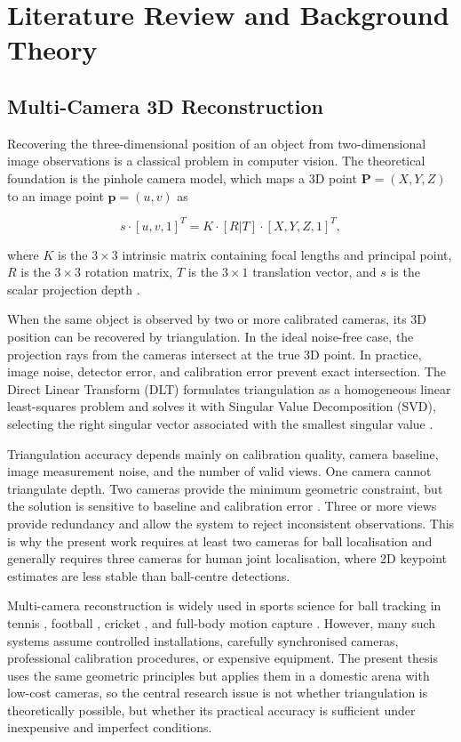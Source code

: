\chapter{Literature Review and Background Theory}

\section{Multi-Camera 3D Reconstruction}

Recovering the three-dimensional position of an object from two-dimensional image observations is a classical problem in computer vision. The theoretical foundation is the pinhole camera model, which maps a 3D point $\mathbf{P} = (X, Y, Z)$ to an image point $\mathbf{p} = (u, v)$ as

\begin{equation}
s \cdot [u, v, 1]^T = K \cdot [R | T] \cdot [X, Y, Z, 1]^T ,
\label{eq:2_1}
\end{equation}

where $K$ is the $3 \times 3$ intrinsic matrix containing focal lengths and principal point, $R$ is the $3 \times 3$ rotation matrix, $T$ is the $3 \times 1$ translation vector, and $s$ is the scalar projection depth \cite{ref1}.

When the same object is observed by two or more calibrated cameras, its 3D position can be recovered by triangulation. In the ideal noise-free case, the projection rays from the cameras intersect at the true 3D point. In practice, image noise, detector error, and calibration error prevent exact intersection. The Direct Linear Transform (DLT) formulates triangulation as a homogeneous linear least-squares problem and solves it with Singular Value Decomposition (SVD), selecting the right singular vector associated with the smallest singular value \cite{ref1, ref2}.

Triangulation accuracy depends mainly on calibration quality, camera baseline, image measurement noise, and the number of valid views. One camera cannot triangulate depth. Two cameras provide the minimum geometric constraint, but the solution is sensitive to baseline and calibration error \cite{ref4}. Three or more views provide redundancy and allow the system to reject inconsistent observations. This is why the present work requires at least two cameras for ball localisation and generally requires three cameras for human joint localisation, where 2D keypoint estimates are less stable than ball-centre detections.

Multi-camera reconstruction is widely used in sports science for ball tracking in tennis \cite{ref5}, football \cite{ref6}, cricket \cite{ref7}, and full-body motion capture \cite{ref8}. However, many such systems assume controlled installations, carefully synchronised cameras, professional calibration procedures, or expensive equipment. The present thesis uses the same geometric principles but applies them in a domestic arena with low-cost cameras, so the central research issue is not whether triangulation is theoretically possible, but whether its practical accuracy is sufficient under inexpensive and imperfect conditions.

